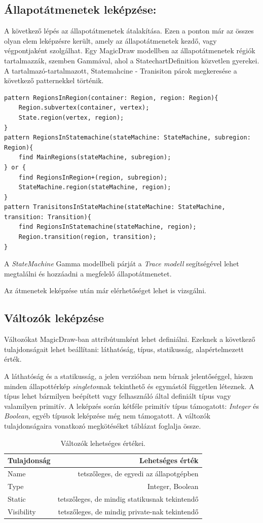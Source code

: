 \subsection{Állapotátmenetek leképzése:} A következő lépés az állapotátmenetek átalakítása. Ezen a ponton már az összes olyan elem leképzésre került, amely az állapotátmenetek kezdő, vagy végpontjaként szolgálhat. Egy MagicDraw modellben az állapotátmenetek régiók tartalmazzák, szemben Gammával, ahol a StatechartDefinition közvetlen gyerekei. A tartalmazó-tartalmazott, Statemahcine - Tranisiton párok megkeresése a következő patternekkel történik.
\lstset{style=VQL}
\begin{lstlisting}
pattern RegionsInRegion(container: Region, region: Region){
	Region.subvertex(container, vertex);
	State.region(vertex, region);
}
pattern RegionsInStatemachine(stateMachine: StateMachine, subregion: Region){
	find MainRegions(stateMachine, subregion);
} or {
	find RegionsInRegion+(region, subregion);
	StateMachine.region(stateMachine, region);
}
pattern TranisitonsInStateMachine(stateMachine: StateMachine, transition: Transition){
	find RegionsInStatemachine(stateMachine, region);
	Region.transition(region, transition);
}
\end{lstlisting}

A \emph{StateMachine} Gamma modellbeli párját a \emph{Trace modell} segítségével lehet megtalálni és hozzáadni a megfelelő állapotátmenetet.

Az átmenetek leképzése után már elérhetőséget lehet is vizsgálni.

\subsection{Változók leképzése}
Változókat MagicDraw-ban attribútumként lehet definiálni. Ezeknek a következő tulajdonságait lehet beállítani: láthatóság, típus, statikusság, alapértelmezett érték.

A láthatóság és a statikusság, a jelen verzióban nem bírnak jelentőséggel, hiszen minden állapottérkép \emph{singleton}nak tekinthető és egymástól független léteznek. A típus lehet bármilyen beépített vagy felhasználó által definiált típus vagy valamilyen primitív. A leképzés során kétféle primitív típus támogatott: \emph{Integer} és \emph{Boolean}, egyéb típusok leképzése még nem támogatott. A változók tulajdonságaira vonatkozó megkötéséket  táblázat foglalja össze.

\begin{table}[!h]
	\footnotesize
	\centering
	\begin{tabular}{ l r }
		Tulajdonság & Lehetséges érték\\ \hline
		Name & tetszőleges, de egyedi az állapotgépben\\
		Type & Integer, Boolean\\
		Static & tetszőleges, de mindig statikusnak tekintendő\\
		Visibility & tetszőleges, de mindig private-nak tekintendő
	\end{tabular}
	\caption{Változók lehetséges értékei.}
	\label{table:variables}
\end{table}



